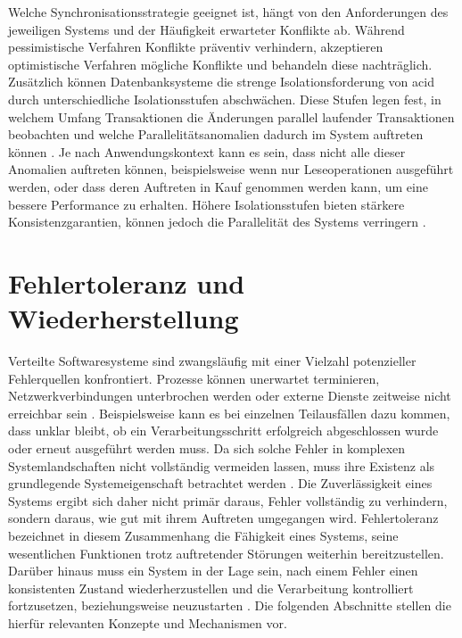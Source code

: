 Welche Synchronisationsstrategie geeignet ist, hängt von den Anforderungen des jeweiligen Systems und der Häufigkeit erwarteter Konflikte ab.
Während pessimistische Verfahren Konflikte präventiv verhindern, akzeptieren optimistische Verfahren mögliche Konflikte und
behandeln diese nachträglich.
Zusätzlich können Datenbanksysteme die strenge Isolationsforderung von \gls{acid} durch unterschiedliche Isolationsstufen abschwächen.
Diese Stufen legen fest, in welchem Umfang Transaktionen die Änderungen parallel laufender Transaktionen beobachten
und welche Parallelitätsanomalien dadurch im System auftreten können \parencite[251]{kudras_taschenbuch_2015}.
Je nach Anwendungskontext kann es sein, dass nicht alle dieser Anomalien auftreten können, beispielsweise wenn nur Leseoperationen
ausgeführt werden, oder dass deren Auftreten in Kauf genommen werden kann, um eine bessere Performance zu erhalten.
Höhere Isolationsstufen bieten stärkere Konsistenzgarantien, können jedoch die Parallelität des Systems verringern
\parencite[Kap.~13.1.3]{saake_datenbanken_2018}.

\section{Fehlertoleranz und Wiederherstellung}
\label{sec:fehlertoleranz}
Verteilte Softwaresysteme sind zwangsläufig mit einer Vielzahl potenzieller Fehlerquellen konfrontiert.
Prozesse können unerwartet terminieren, Netzwerkverbindungen unterbrochen werden oder externe Dienste zeitweise nicht erreichbar sein
\parencite[Kap.~1 Abschnitt \glqq The Three Golden Rules Of Distributed Systems\grqq]{newman_building_2026}.
Beispielsweise kann es bei einzelnen Teilausfällen dazu kommen, dass unklar bleibt, ob ein Verarbeitungsschritt
erfolgreich abgeschlossen wurde oder erneut ausgeführt werden muss.
Da sich solche Fehler in komplexen Systemlandschaften nicht vollständig vermeiden lassen, muss ihre Existenz als grundlegende
Systemeigenschaft betrachtet werden \parencite[Kap.~1 Abschnitt \glqq Failure Is Inevitable\grqq]{newman_building_2026}.
Die Zuverlässigkeit eines Systems ergibt sich daher nicht primär daraus, Fehler vollständig zu verhindern, sondern daraus,
wie gut mit ihrem Auftreten umgegangen wird.
Fehlertoleranz bezeichnet in diesem Zusammenhang die Fähigkeit eines Systems, seine wesentlichen Funktionen trotz auftretender
Störungen weiterhin bereitzustellen.
Darüber hinaus muss ein System in der Lage sein, nach einem Fehler einen konsistenten Zustand wiederherzustellen und die
Verarbeitung kontrolliert fortzusetzen, beziehungsweise neuzustarten \parencite[Kap.~1 \glqq What Is Resilience?\grqq]{newman_building_2026}.
Die folgenden Abschnitte stellen die hierfür relevanten Konzepte und Mechanismen vor.

